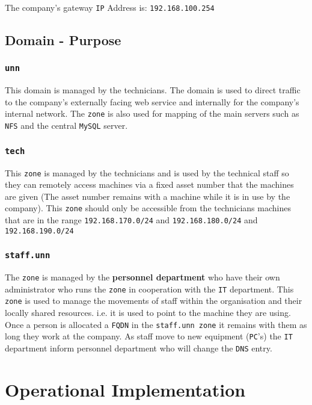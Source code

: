 \documentclass[11pt]{article}
\begin{document}
\noindent The company’s gateway \texttt{IP} Address is: \texttt{192.168.100.254}

\subsection{Domain - Purpose}

\subsubsection{\texttt{unn}}
This domain is managed by the technicians. The domain is used to direct traffic to the company’s externally facing web service and internally 
for the company’s internal network. The \texttt{zone} is also used for mapping of the main servers such as \texttt{NFS} and the central \texttt{MySQL} server. 

\subsubsection{\texttt{tech}}
This \texttt{zone} is managed by the technicians and is used by the technical staff so they can remotely access machines via a fixed asset number that 
the machines are given (The asset number remains with a machine while it is in use by the company). This \texttt{zone} should only be accessible from 
the technicians machines that are in the range \texttt{192.168.170.0/24} and \texttt{192.168.180.0/24} and \texttt{192.168.190.0/24}

\subsubsection{\texttt{staff.unn}}
The \texttt{zone} is managed by the \textbf{personnel department} who have their own administrator who runs the \texttt{zone} in cooperation with the \texttt{IT} 
department. This \texttt{zone} is used to manage the movements of staff within the organisation and their locally shared resources. i.e. it is used to point 
to the machine they are using. Once a person is allocated a \texttt{FQDN} in the \texttt{staff.unn zone} it remains with them as long they work at the company. 
As staff move to new equipment (\texttt{PC}’s) the \texttt{IT} department inform personnel department who will change the \texttt{DNS} entry.

\section{Operational Implementation}
\end{document}
